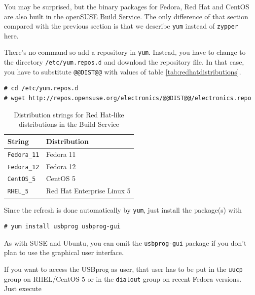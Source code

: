 \documentclass[bibtotoc,UKenglish,halfparskip,oneside,DIV12]{scrreprt}
\begin{document}
You may be surprised, but the binary packages for Fedora, Red Hat and CentOS are also built in the
\href{https://build.opensuse.org/}{openSUSE Build Service}. The only difference of that section
compared with the previous section is that we describe \texttt{yum} instead of \texttt{zypper} here.

There's no command so add a repository in \texttt{yum}. Instead, you have to change to the directory
\texttt{/etc/yum.repos.d} and download the repository file. In that case, you have to substitute
\texttt{@@DIST@@} with values of table \vref{tab:redhatdistributions}.

\begin{lstlisting}[style=inline]
% su
# cd /etc/yum.repos.d
# wget http://repos.opensuse.org/electronics/@@DIST@@/electronics.repo
\end{lstlisting}

\begin{table}[htb]
  \centering
  \begin{tabular}{|p{4cm}p{10cm}|}
    \hline
    \textbf{String}                 & \textbf{Distribution}                               \\
    \hline
    \hline
    \texttt{Fedora\_11}             & Fedora 11                                           \\
    \texttt{Fedora\_12}             & Fedora 12                                           \\
    \texttt{CentOS\_5}              & CentOS 5                                            \\
    \texttt{RHEL\_5}                & Red Hat Enterprise Linux 5                          \\
    \hline
  \end{tabular}
  \caption{Distribution strings for Red Hat-like distributions in the Build Service}
  \label{tab:redhatdistributions}
\end{table}

Since the refresh is done automatically by \texttt{yum}, just install the package(s) with

\begin{lstlisting}[style=inline]
# yum install usbprog usbprog-gui
\end{lstlisting}

As with SUSE and Ubuntu, you can omit the \texttt{usbprog-gui} package if you don't plan to use the
graphical user interface.

If you want to access the USBprog as user, that user has to be put in the \texttt{uucp} group on
RHEL/CentOS 5 or in the \texttt{dialout} group on recent Fedora versions. Just execute
\end{document}
